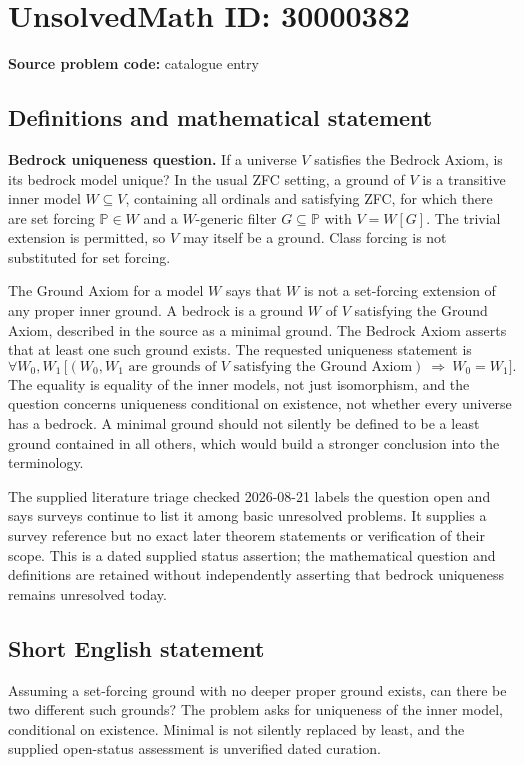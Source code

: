 \documentclass[11pt]{article}
\begin{document}
\section*{UnsolvedMath ID: 30000382}
\textbf{Source problem code:} catalogue entry
\subsection{Definitions and mathematical statement}
\textbf{Bedrock uniqueness question.} If a universe \(V\) satisfies the Bedrock Axiom, is its bedrock model unique? In the usual ZFC setting, a ground of \(V\) is a transitive inner model \(W\subseteq V\), containing all ordinals and satisfying ZFC, for which there are set forcing \(\mathbb P\in W\) and a \(W\)-generic filter \(G\subseteq\mathbb P\) with \(V=W[G]\). The trivial extension is permitted, so \(V\) may itself be a ground. Class forcing is not substituted for set forcing.\par The Ground Axiom for a model \(W\) says that \(W\) is not a set-forcing extension of any proper inner ground. A bedrock is a ground \(W\) of \(V\) satisfying the Ground Axiom, described in the source as a minimal ground. The Bedrock Axiom asserts that at least one such ground exists. The requested uniqueness statement is\[\forall W_0,W_1\,\bigl[(W_0,W_1\text{ are grounds of }V\text{ satisfying the Ground Axiom})\ \Longrightarrow\ W_0=W_1\bigr].\] The equality is equality of the inner models, not just isomorphism, and the question concerns uniqueness conditional on existence, not whether every universe has a bedrock. A minimal ground should not silently be defined to be a least ground contained in all others, which would build a stronger conclusion into the terminology.\par The supplied literature triage checked 2026-08-21 labels the question open and says surveys continue to list it among basic unresolved problems. It supplies a survey reference but no exact later theorem statements or verification of their scope. This is a dated supplied status assertion; the mathematical question and definitions are retained without independently asserting that bedrock uniqueness remains unresolved today.
\subsection{Short English statement}
Assuming a set-forcing ground with no deeper proper ground exists, can there be two different such grounds? The problem asks for uniqueness of the inner model, conditional on existence. Minimal is not silently replaced by least, and the supplied open-status assessment is unverified dated curation.
\end{document}

